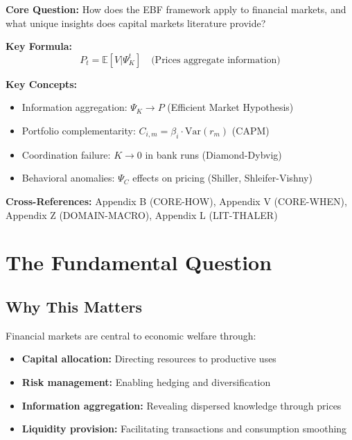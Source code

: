 \begin{tcolorbox}[colback=blue!5!white, colframe=blue!75!black,
    title=Quick Reference: Capital Markets]

\textbf{Core Question:} How does the EBF framework apply to financial markets,
and what unique insights does capital markets literature provide?

\textbf{Key Formula:}
\begin{equation}
P_t = \mathbb{E}[V | \Psi_K^t] \quad \text{(Prices aggregate information)}
\end{equation}

\textbf{Key Concepts:}
\begin{itemize}[nosep]
\item Information aggregation: $\Psi_K \to P$ (Efficient Market Hypothesis)
\item Portfolio complementarity: $C_{i,m} = \beta_i \cdot \text{Var}(r_m)$ (CAPM)
\item Coordination failure: $K \to 0$ in bank runs (Diamond-Dybvig)
\item Behavioral anomalies: $\Psi_C$ effects on pricing (Shiller, Shleifer-Vishny)
\end{itemize}

\textbf{Cross-References:} Appendix B (CORE-HOW), Appendix V (CORE-WHEN),
Appendix Z (DOMAIN-MACRO), Appendix L (LIT-THALER)
\end{tcolorbox}


\section{The Fundamental Question}
\label{sec:Y-fundamental}

\subsection{Why This Matters}

Financial markets are central to economic welfare through:
\begin{itemize}
    \item \textbf{Capital allocation:} Directing resources to productive uses
    \item \textbf{Risk management:} Enabling hedging and diversification
    \item \textbf{Information aggregation:} Revealing dispersed knowledge through prices
    \item \textbf{Liquidity provision:} Facilitating transactions and consumption smoothing
\end{itemize}

